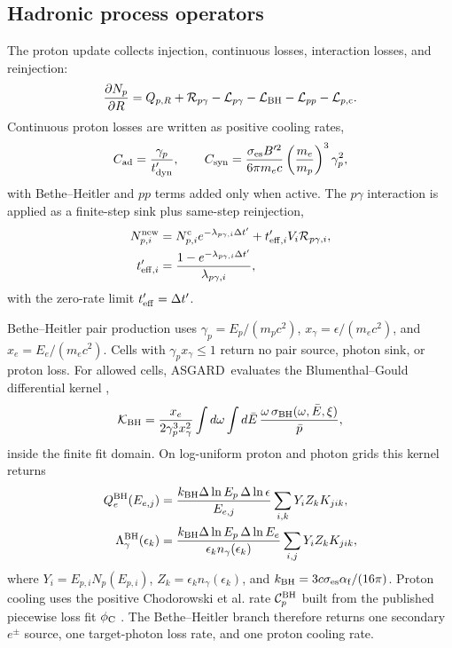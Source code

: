 \documentclass[twocolumn]{aastex702}
\newcommand{\asgard}{\textsc{ASGARD}}
\begin{document}
\subsection{Hadronic process operators}

The proton update collects injection, continuous losses, interaction losses, and
reinjection:
\begin{equation}
\frac{\partial N_p}{\partial R}
=Q_{p,R}+\mathcal{R}_{p\gamma}
-\mathcal{L}_{p\gamma}-\mathcal{L}_{\rm BH}
-\mathcal{L}_{pp}-\mathcal{L}_{p,{\rm c}} .
\end{equation}
Continuous proton losses are written as positive cooling rates,
\begin{equation}
C_{\rm ad}=\frac{\gamma_p}{t'_{\rm dyn}},\qquad
C_{\rm syn}=
\frac{\sigma_{\rm es} B'^2}{6\pi m_ec}
\left(\frac{m_e}{m_p}\right)^3\gamma_p^2,
\end{equation}
with Bethe--Heitler and \(pp\) terms added only when active.  The \(p\gamma\)
interaction is applied as a finite-step sink plus same-step reinjection,
\begin{equation}
\begin{aligned}
N_{p,i}^{\rm new}
&=N_{p,i}^{\rm c}e^{-\lambda_{p\gamma,i}\Delta t'}
+t'_{{\rm eff},i}V_i\mathcal{R}_{p\gamma,i},\\
t'_{{\rm eff},i}
&=\frac{1-e^{-\lambda_{p\gamma,i}\Delta t'}}{\lambda_{p\gamma,i}},
\end{aligned}
\end{equation}
with the zero-rate limit \(t'_{\rm eff}=\Delta t'\).

Bethe--Heitler pair production uses
\(\gamma_p=E_p/(m_pc^2)\), \(x_\gamma=\epsilon/(m_ec^2)\), and
\(x_e=E_e/(m_ec^2)\).  Cells with \(\gamma_px_\gamma\le1\) return no pair source,
photon sink, or proton loss.  For allowed cells, \asgard\ evaluates the
Blumenthal--Gould differential kernel
\citep{BlumenthalGould1970},
\begin{equation}
\mathcal{K}_{\rm BH}
=\frac{x_e}{2\gamma_p^3x_\gamma^2}
\int d\omega\int d\bar E\,
\frac{\omega\,\sigma_{\rm BH}(\omega,\bar E,\xi)}{\bar p},
\end{equation}
inside the finite fit domain.  On log-uniform proton and photon grids this kernel
returns
\begin{equation}
\begin{aligned}
Q_e^{\rm BH}(E_{e,j})
&=\frac{k_{\rm BH}\Delta\ln E_p\,\Delta\ln\epsilon}{E_{e,j}}
\sum_{i,k}Y_iZ_kK_{jik},\\
\Lambda_{\gamma}^{\rm BH}(\epsilon_k)
&=\frac{k_{\rm BH}\Delta\ln E_p\,\Delta\ln E_e}{\epsilon_kn_\gamma(\epsilon_k)}
\sum_{i,j}Y_iZ_kK_{jik},
\end{aligned}
\end{equation}
where \(Y_i=E_{p,i}N_p(E_{p,i})\), \(Z_k=\epsilon_kn_\gamma(\epsilon_k)\), and
\(k_{\rm BH}=3c\sigma_{\rm es}\alpha_{\rm f}/(16\pi)\).  Proton cooling uses the
positive Chodorowski et al. rate \(\mathcal C_p^{\rm BH}\) built from the
published piecewise loss fit \(\phi_{\rm C}\) \citep{Chodorowski1992}.  The
Bethe--Heitler branch therefore returns one secondary \(e^\pm\) source, one
target-photon loss rate, and one proton cooling rate.
\end{document}
